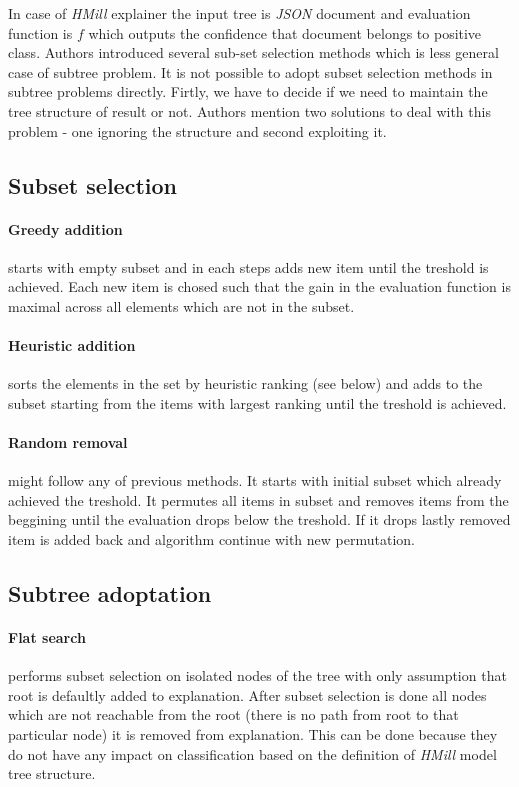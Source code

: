 In case of \emph{HMill} explainer the input tree is \emph{JSON} document and evaluation function is $f$ which outputs the confidence that document belongs to positive class. Authors introduced several sub-set selection methods which is less general case of subtree problem. It is not possible to adopt subset selection methods in subtree problems directly. Firtly, we have to decide if we need to maintain the tree structure of result or not. Authors mention two solutions to deal with this problem - one ignoring the structure and second exploiting it.

\subsection{Subset selection}
\paragraph{Greedy addition} starts with empty subset and in each steps adds new item until the treshold is achieved. Each new item is chosed such that the gain in the evaluation function is maximal across all elements which are not in the subset.
\paragraph{Heuristic addition} sorts the elements in the set by heuristic ranking (see below) and adds to the subset starting from the items with largest ranking until the treshold is achieved.
\paragraph{Random removal} might follow any of previous methods. It starts with initial subset which already achieved the treshold. It permutes all items in subset and removes items from the beggining until the evaluation drops below the treshold. If it drops lastly removed item is added back and algorithm continue with new permutation.
\subsection{Subtree adoptation}
\paragraph{Flat search} performs subset selection on isolated nodes of the tree with only assumption that root is defaultly added to explanation. After subset selection is done all nodes which are not reachable from the root (there is no path from root to that particular node) it is removed from explanation. This can be done because they do not have any impact on classification based on the definition of \emph{HMill} model tree structure.
